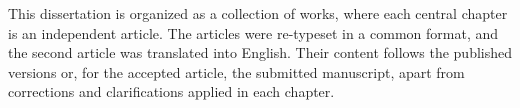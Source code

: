 This dissertation is organized as a collection of works, where each central chapter is an
independent article. The articles were re-typeset in a common format, and the second
article was translated into English. Their content follows the published versions or,
for the accepted article, the submitted manuscript, apart from corrections and clarifications
applied in each chapter.
